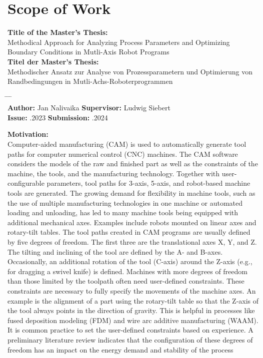 \chapter*{Scope of Work}


\textbf{Title of the Master's Thesis:}\\
\Large{Methodical Approach for Analyzing Process Parameters and Optimizing Boundary Conditions in Mutli-Axis Robot Programs}\\
\newline
\normalsize{\textbf{Titel der Master's Thesis:}}\\
\Large{Methodischer Ansatz zur Analyse von Prozessparametern und Optimierung von Randbedingungen in Mutli-Achs-Roboterprogrammen}
\normalsize

\begin{tabbing}
	\hspace{7em} 		\= \hspace{13em}			\= \hspace{7em} 		\= \kill
				\> 						\> \\
	\textbf{Author:} \>  Jan Nalivaika	\> \textbf{Supervisor:} 	\>Ludwig Siebert  \\
	\textbf{Issue:} 	.2023	\> \textbf{Submission:} 	.2024
\end{tabbing}

\vspace{5mm}
\textbf{Motivation:}\\
Computer-aided manufacturing (CAM) is used to automatically generate tool paths for computer numerical control (CNC) machines. The CAM software considers the models of the raw and finished part as well as the constraints of the machine, the tools, and the manufacturing technology. Together with user-configurable parameters, tool paths for 3-axis, 5-axis, and robot-based machine tools are generated. The growing demand for flexibility in machine tools, such as the use of multiple manufacturing technologies in one machine or automated loading and unloading, has led to many machine tools being equipped with additional mechanical axes. Examples include robots mounted on linear axes and rotary-tilt tables.
The tool paths created in CAM programs are usually defined by five degrees of freedom. The first three are the translational axes X, Y, and Z. The tilting and inclining of the tool are defined by the A- and B-axes. Occasionally, an additional rotation of the tool (C-axis) around the Z-axis (e.g., for dragging a swivel knife) is defined. Machines with more degrees of freedom than those limited by the toolpath often need user-defined constraints. These constraints are necessary to fully specify the movements of the machine axes. An example is the alignment of a part using the rotary-tilt table so that the Z-axis of the tool always points in the direction of gravity. This is helpful in processes like fused deposition modeling (FDM) and wire arc additive manufacturing (WAAM). 
It is common practice to set the user-defined constraints based on experience. A preliminary literature review indicates that the configuration of these degrees of freedom has an impact on the energy demand and stability of the process

